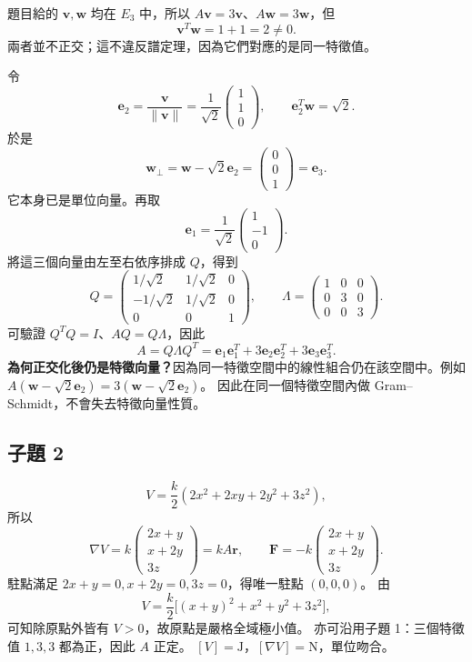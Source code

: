 \documentclass[12pt,a4paper]{article}
\begin{document}
題目給的 \(\mathbf v,\mathbf w\) 均在 \(E_3\) 中，所以
\(A\mathbf v=3\mathbf v\)、\(A\mathbf w=3\mathbf w\)，但
\[
  \mathbf v^T\mathbf w=1+1=2\ne0.
\]
兩者並不正交；這不違反譜定理，因為它們對應的是同一特徵值。

令
\[
  \mathbf e_2=\frac{\mathbf v}{\|\mathbf v\|}
  =\frac1{\sqrt2}\begin{pmatrix}1\\1\\0\end{pmatrix},
  \qquad \mathbf e_2^T\mathbf w=\sqrt2.
\]
於是
\[
  \mathbf w_\perp=\mathbf w-\sqrt2\mathbf e_2
  =\begin{pmatrix}0\\0\\1\end{pmatrix}=\mathbf e_3.
\]
它本身已是單位向量。再取
\[
  \mathbf e_1=\frac1{\sqrt2}\begin{pmatrix}1\\-1\\0\end{pmatrix}.
\]
將這三個向量由左至右依序排成 \(Q\)，得到
\[
  Q=\begin{pmatrix}
    1/\sqrt2  & 1/\sqrt2 & 0 \\
    -1/\sqrt2 & 1/\sqrt2 & 0 \\
    0         & 0        & 1
  \end{pmatrix},\qquad
  \Lambda=\begin{pmatrix}1&0&0\\0&3&0\\0&0&3\end{pmatrix}.
\]
可驗證 \(Q^TQ=I\)、\(AQ=Q\Lambda\)，因此
\[
  \boxed{A=Q\Lambda Q^T
    =\mathbf e_1\mathbf e_1^T+3\mathbf e_2\mathbf e_2^T+3\mathbf e_3\mathbf e_3^T}.
\]
\textbf{為何正交化後仍是特徵向量？}因為同一特徵空間中的線性組合仍在該空間中。例如
\(A(\mathbf w-\sqrt2\mathbf e_2)=3(\mathbf w-\sqrt2\mathbf e_2)\)。
因此在同一個特徵空間內做 Gram--Schmidt，不會失去特徵向量性質。

\subsection*{子題 2}
\[
  V=\frac{k}{2}(2x^2+2xy+2y^2+3z^2),
\]
所以
\[
  \nabla V=k\begin{pmatrix}2x+y\\x+2y\\3z\end{pmatrix}=kA\mathbf r,
  \qquad
  \boxed{\mathbf F=-k\begin{pmatrix}2x+y\\x+2y\\3z\end{pmatrix}}.
\]
駐點滿足 \(2x+y=0,x+2y=0,3z=0\)，得唯一駐點 \((0,0,0)\)。
由
\[
  V=\frac{k}{2}\big[(x+y)^2+x^2+y^2+3z^2\big],
\]
可知除原點外皆有 \(V>0\)，故原點是嚴格全域極小值。
亦可沿用子題 1：三個特徵值 \(1,3,3\) 都為正，因此 \(A\) 正定。
\([V]=\mathrm{J}\)，\([\nabla V]=\mathrm N\)，單位吻合。
\end{document}
